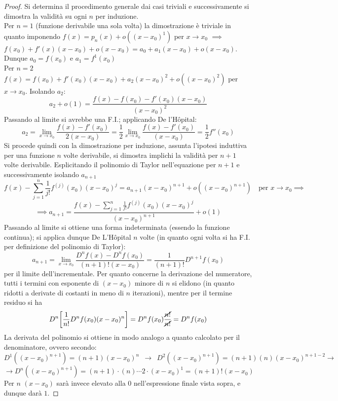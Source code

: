 \documentclass[10pt, oneside]{book}
\theoremstyle{plain}
\begin{document}
\begin{proof}
Si determina il procedimento generale dai casi triviali e successivamente si dimostra la validità su ogni $n$ per induzione.
\\Per $n = 1$ (funzione derivabile una sola volta) la dimostrazione è triviale in quanto imponendo $f(x) = p_n(x) + o ((x - x_0)^1)$ per $x \rightarrow x_0$ $\implies$ $f(x_0) + f'(x)(x-x_0) + o(x-x_0) = a_0 + a_1 (x-x_0) + o(x-x_0)$. Dunque $a_0 = f(x_0)$ e $a_1 = f^1(x_0)$
\\Per $n=2$ $f(x) = f(x_0) + f'(x_0) (x-x_0) + a_2 (x-x_0)^2 + o((x-x_0)^2)$ per $x \rightarrow x_0$. Isolando $a_2$:
\[a_2 + o(1) = \frac{f(x) - f(x_0) - f'(x_0) (x-x_0) }{(x - x_0)^2}\]
Passando al limite si avrebbe una F.I.; applicando De l'H\^opital:
\[a_2 = \lim \limits_{x \rightarrow x_0} \frac{f(x) - f'(x_0)}{2 (x - x_0)} = \frac{1}{2} \lim \limits_{x \rightarrow x_0} \frac{f(x) - f'(x_0)}{(x - x_0)} = \frac{1}{2}f''(x_0)\]
Si procede quindi con la dimostrazione per induzione, assunta l'ipotesi induttiva per una funzione $n$ volte derivabile, si dimostra implichi la validità per $n+1$ volte derivabile. Esplicitando il polinomio di Taylor nell'equazione per $n+1$ e successivamente isolando $a_{n+1}$
\[f(x)- \sum \limits_{j = 1}^n \frac{1}{j!}f^{(j)}(x_0) (x - x_0)^j = a_{n+1}(x - x_0)^{n+1} + o((x-x_0)^{n+1}) \quad \textrm{per } x \rightarrow x_0 \implies\] \[\implies a_{n+1} = \frac{f(x)- \sum \limits_{j = 1}^n \frac{1}{j!}f^{(j)}(x_0) (x - x_0)^j}{(x - x_0)^{n+1}} + o(1)\]
Passando al limite si ottiene una forma indeterminata (essendo la funzione continua); si applica dunque De L'H\^opital $n$ volte (in quanto ogni volta si ha F.I. per definizione del polinomio di Taylor):
\[a_{n+1} = \lim \limits_{x \rightarrow x_0} \frac{D^nf(x) - D^nf(x_0)}{(n+1)!(x-x_0)} = \frac{1}{(n+1)!}D^{n+1}f(x_0)\]
per il limite dell'incrementale. Per quanto concerne la derivazione del numeratore, tutti i termini con esponente di $(x - x_0)$ minore di $n$ si elidono (in quanto ridotti a derivate di costanti in meno di $n$ iterazioni), mentre per il termine residuo si ha 
\[D^n \bigg[\frac{1}{n!}D^nf(x_0) (x-x_0)^n\bigg] = D^nf(x_0)\frac{\cancel{n!}}{\cancel{n!}} = D^nf(x_0)\]
La derivata del polinomio si ottiene in modo analogo a quanto calcolato per il denominatore, ovvero secondo:
\[D^1((x-x_0)^{n+1}) = (n+1) (x - x_0)^n \enspace \rightarrow \enspace D^2((x-x_0)^{n+1}) = (n+1)(n) (x - x_0)^{n+1-2} \rightarrow \] \[\rightarrow D^n((x-x_0)^{n+1}) = (n+1) \cdot (n) \cdots 2 \cdot (x - x_0)^1 = (n+1)!(x-x_0)\]
Per $n$ $(x - x_0)$ sarà invece elevato alla $0$ nell'espressione finale vista sopra, e dunque darà $1$.
\end{proof}
\end{document}
